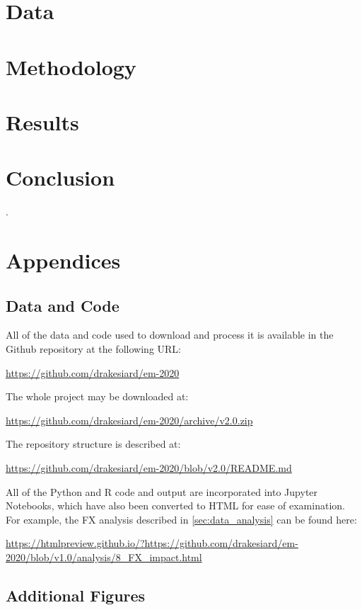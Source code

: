 \documentclass[12pt,a4paper]{article}
\begin{document}
\section{Data}\label{sec:data}

\section{Methodology}\label{sec:methodology}

\section{Results}\label{sec:results}

\section{Conclusion}\label{sec:conclusion}

\clearpage

\appendix

\renewcommand{\refname}{\section{References}\label{sec:references}}.


\clearpage

\section{Appendices}

\subsection{Data and Code}\label{sec:data_and_code}

All of the data and code used to download and process it is available in the Github repository at the following URL:

\url{https://github.com/drakesiard/em-2020}

\noindent
The whole project may be downloaded at:

\url{https://github.com/drakesiard/em-2020/archive/v2.0.zip}

\noindent
The repository structure is described at:

\url{https://github.com/drakesiard/em-2020/blob/v2.0/README.md}

\noindent
All of the Python and R code and output are incorporated into Jupyter Notebooks, which have also been converted to HTML for ease of examination. For example, the FX analysis described in \cref{sec:data_analysis} can be found here:

\begin{adjustbox}{max width=\textwidth}
\url{https://htmlpreview.github.io/?https://github.com/drakesiard/em-2020/blob/v1.0/analysis/8_FX_impact.html}
\end{adjustbox}

\clearpage
\subsection{Additional Figures}\label{sec:graph_appendix}

\listoffigures
\listoftables

\restoregeometry{}
\end{document}
